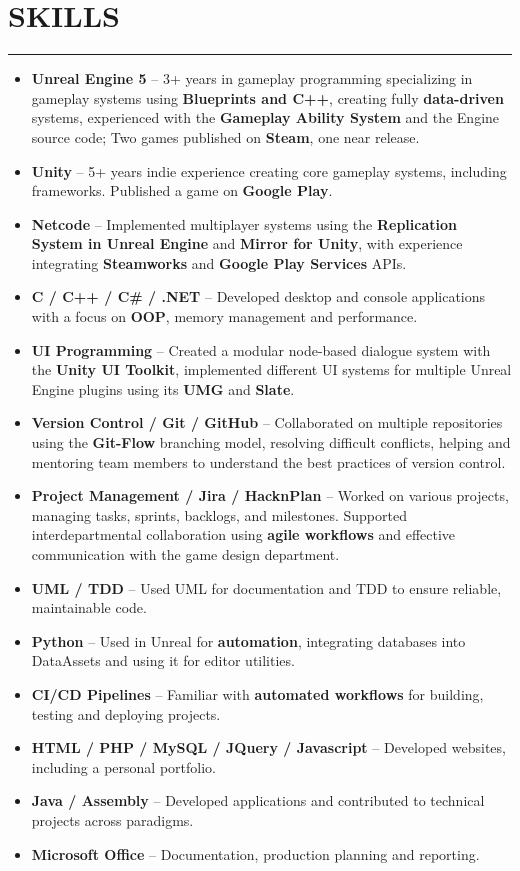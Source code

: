 \documentclass[7pt]{article}
\newcommand{\sectionline}{\vspace{-0.3em}\noindent\rule{\linewidth}{0.15pt}\vspace{0.08em}}
\newcommand{\cvsection}[2]{%
    \vspace{-.6em}
    \section*{{\large\textbf{\MakeUppercase{#1}}}}
    \vspace{-0.5em}
    \sectionline
    \vspace{-0.15em}
    #2
}
\begin{document}
    \cvsection{SKILLS}{
        \begin{itemize}[noitemsep, topsep=0pt, parsep=0pt, partopsep=0pt, itemsep=0pt, leftmargin=*]
            \item \textbf{Unreal Engine 5} – 3+ years in gameplay programming specializing in gameplay systems using \textbf{Blueprints and C++}, creating fully \textbf{data-driven} systems,  experienced with the \textbf{Gameplay Ability System} and the Engine source code; Two games published on \textbf{Steam}, one near release.
            \item \textbf{Unity} – 5+ years indie experience creating core gameplay systems, including frameworks. Published a game on \textbf{Google Play}.
            \item \textbf{Netcode} – Implemented multiplayer systems using the \textbf{Replication System in Unreal Engine} and \textbf{Mirror for Unity}, with experience integrating \textbf{Steamworks} and \textbf{Google Play Services} APIs.
            \item \textbf{C / C++ / C\# / .NET} – Developed desktop and console applications with a focus on \textbf{OOP}, memory management and performance.
            \item \textbf{UI Programming} – Created a modular node-based dialogue system with the \textbf{Unity UI Toolkit}, implemented different UI systems for multiple Unreal Engine plugins using its \textbf{UMG} and \textbf{Slate}.
            \item \textbf{Version Control / Git / GitHub} – Collaborated on multiple repositories using the \textbf{Git-Flow} branching model, resolving difficult conflicts, helping and mentoring team members to understand the best practices of version control.
            \item \textbf{Project Management / Jira / HacknPlan} – Worked on various projects, managing tasks, sprints, backlogs, and milestones. Supported interdepartmental collaboration using \textbf{agile workflows} and effective communication with the game design department.
            \item \textbf{UML / TDD} – Used UML for documentation and TDD to ensure reliable, maintainable code.
            \item \textbf{Python} – Used in Unreal for \textbf{automation}, integrating databases into DataAssets and using it for editor utilities.
            \item \textbf{CI/CD Pipelines} – Familiar with \textbf{automated workflows} for building, testing and deploying projects.
            \item \textbf{HTML / PHP / MySQL / JQuery / Javascript} – Developed websites, including a personal portfolio.
            \item \textbf{Java / Assembly} – Developed applications and contributed to technical projects across paradigms.
            \item \textbf{Microsoft Office} – Documentation, production planning and reporting.
        \end{itemize}
    }
\end{document}

